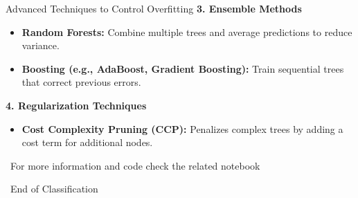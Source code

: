 \documentclass[serif, aspectratio=169]{beamer}
\begin{document}
\begin{frame}{Advanced Techniques to Control Overfitting}
    \textbf{3. Ensemble Methods}
    \begin{itemize}
        \item \textbf{Random Forests:} Combine multiple trees and average predictions to reduce variance.
        \item \textbf{Boosting (e.g., AdaBoost, Gradient Boosting):} Train sequential trees that correct previous errors.
    \end{itemize}
    \textbf{4. Regularization Techniques}
    \begin{itemize}
        \item \textbf{Cost Complexity Pruning (CCP):} Penalizes complex trees by adding a cost term for additional nodes.
    \end{itemize}
\end{frame}

\begin{frame}
    \begin{center}
        {\Huge\ \color{red}For more information and code check the related notebook}
    \end{center}
\end{frame}


\begin{frame}
    \begin{center}
        {\Huge\ End of Classification}
    \end{center}
\end{frame}
\end{document}
